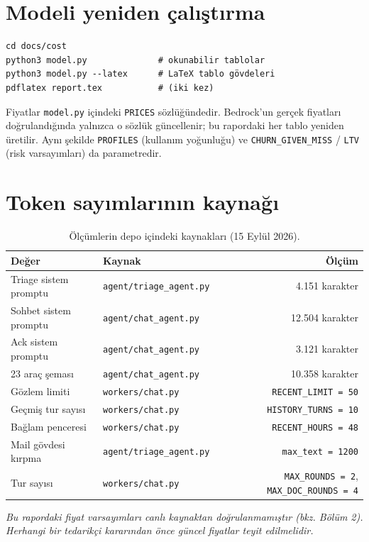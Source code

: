 \documentclass[11pt,a4paper]{article}
\newcommand{\code}[1]{\texttt{\small #1}}
\begin{document}
\section{Modeli yeniden çalıştırma}

\begin{verbatim}
cd docs/cost
python3 model.py              # okunabilir tablolar
python3 model.py --latex      # LaTeX tablo gövdeleri
pdflatex report.tex           # (iki kez)
\end{verbatim}

Fiyatlar \code{model.py} içindeki \code{PRICES} sözlüğündedir. Bedrock'un gerçek
fiyatları doğrulandığında yalnızca o sözlük güncellenir; bu rapordaki her tablo yeniden
üretilir. Aynı şekilde \code{PROFILES} (kullanım yoğunluğu) ve
\code{CHURN\_GIVEN\_MISS} / \code{LTV} (risk varsayımları) da parametredir.

\section{Token sayımlarının kaynağı}

\begin{table}[h]
\centering\small
\begin{tabular}{@{}llr@{}}
\toprule
\textbf{Değer} & \textbf{Kaynak} & \textbf{Ölçüm} \\
\midrule
Triage sistem promptu & \code{agent/triage\_agent.py} & 4.151 karakter \\
Sohbet sistem promptu & \code{agent/chat\_agent.py} & 12.504 karakter \\
Ack sistem promptu & \code{agent/chat\_agent.py} & 3.121 karakter \\
23 araç şeması & \code{agent/chat\_agent.py} & 10.358 karakter \\
Gözlem limiti & \code{workers/chat.py} & \code{RECENT\_LIMIT = 50} \\
Geçmiş tur sayısı & \code{workers/chat.py} & \code{HISTORY\_TURNS = 10} \\
Bağlam penceresi & \code{workers/chat.py} & \code{RECENT\_HOURS = 48} \\
Mail gövdesi kırpma & \code{agent/triage\_agent.py} & \code{max\_text = 1200} \\
Tur sayısı & \code{workers/chat.py} & \code{MAX\_ROUNDS = 2}, \code{MAX\_DOC\_ROUNDS = 4} \\
\bottomrule
\end{tabular}
\caption{Ölçümlerin depo içindeki kaynakları (15 Eylül 2026).}
\end{table}

\vspace{1cm}
\begin{center}
\small\color{ink}
\textit{Bu rapordaki fiyat varsayımları canlı kaynaktan doğrulanmamıştır (bkz. Bölüm 2).\\
Herhangi bir tedarikçi kararından önce güncel fiyatlar teyit edilmelidir.}
\end{center}
\end{document}
